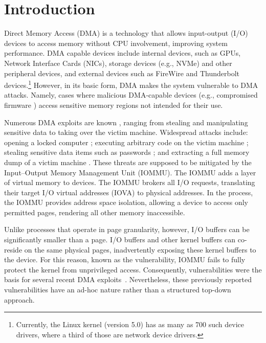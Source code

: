 \section{Introduction}

Direct Memory Access (DMA) is a technology that allows input-output (I/O) devices to access memory without CPU involvement, improving system performance.
DMA capable devices include internal devices, such as GPUs, Network Interface Cards (NICs), storage devices (e.g., NVMe) and other peripheral devices, and external devices such as FireWire and Thunderbolt devices.\footnote{Currently, the Linux kernel (version 5.0) has as many as 700 such device drivers, where a third of those are network device drivers.} However, in its basic form, DMA makes the system vulnerable to DMA attacks. Namely, cases where malicious DMA-capable devices (e.g., compromised firmware \cite{Gal14,Ben17a}) access sensitive memory regions not intended for their use. 


Numerous DMA exploits are known \cite{Dor04,BDK10,thunder}, ranging from stealing and manipulating sensitive data to taking over the victim machine. Widespread attacks include: opening a locked computer \cite{MM, Fin14}; executing arbitrary code on the victim machine \cite{Fri16, Woj08, AD10,thunder}; stealing sensitive data items such as passwords \cite{SB12, LKV13, Cim16, BR12}; and extracting a full memory dump of a victim machine \cite{MM, Vol, Fin14, GA10}. These threats are supposed to be mitigated by the Input–Output Memory Management Unit (IOMMU). The IOMMU adds a layer of virtual memory to devices. The IOMMU brokers all I/O requests, translating their target I/O virtual addresses (IOVA) to physical addresses. In the process, the IOMMU provides address space isolation, allowing a device to access only permitted pages, rendering all other memory inaccessible.

Unlike processes that operate in page granularity, however, I/O buffers can be significantly smaller than a page. I/O buffers and other kernel buffers can co-reside on the same physical pages, inadvertently exposing these kernel buffers to the device. For this reason, known as the \subpage{} vulnerability\cite{MMT16,thunder}, IOMMU fails to fully protect the kernel from unprivileged access. Consequently, \subpage{} vulnerabilities were the basis for several recent DMA exploits~\cite{kupfer2018iommu,thunder,Ben17a,Ben17b}.
Nevertheless, these previously reported vulnerabilities have an ad-hoc nature rather than a structured top-down approach. 


